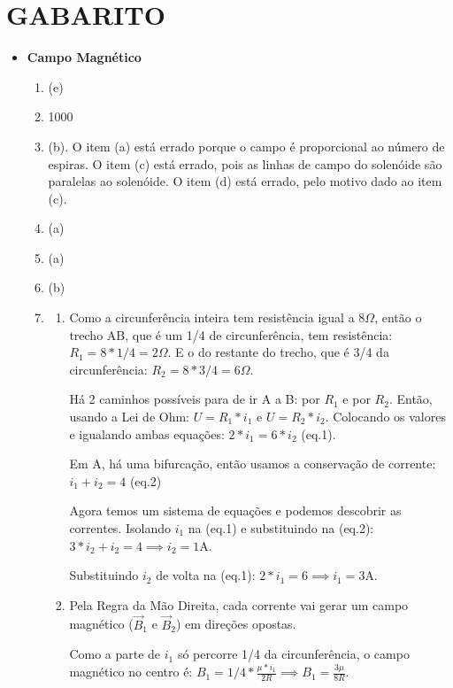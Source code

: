 \documentclass[12pt,letterpaper,fleqn]{article}
\begin{document}
    \pagebreak
    \section*{GABARITO}
    \begin{itemize}
        \item \textbf{Campo Magnético}
        \begin{enumerate}
            \item (e)
            \item 1000
            \item (b). O item (a) está errado porque o campo é proporcional ao número de espiras. O item (c) está errado, pois as linhas de campo do solenóide são paralelas ao solenóide. O item (d) está errado, pelo motivo dado ao item (c).
            \item (a)
            \item (a)
            \item (b) 
            \item 
            \begin{enumerate}
                \item Como a circunferência inteira tem resistência igual a $8 \Omega$, então o trecho AB, que é um 1/4 de circunferência, tem resistência: $R_1 = 8*1/4 = 2 \Omega$. E o do restante do trecho, que é 3/4 da circunferência: $R_2 = 8* 3/4 = 6 \Omega$.
                
                Há 2 caminhos possíveis para de ir A a B: por $R_1$ e por $R_2$. Então, usando a Lei de Ohm: $U = R_1*i_1$ e $U = R_2*i_2$. 
                Colocando os valores e igualando ambas equações: $2*i_1 = 6*i_2$ (eq.1).
                
                Em A, há uma bifurcação, então usamos a conservação de corrente: $i_1 + i_2 = 4$ (eq.2)
                
                Agora temos um sistema de equações e podemos descobrir as correntes. Isolando $i_1$ na (eq.1) e substituindo na (eq.2): $3*i_2 + i_2 = 4 \implies i_2 = 1$A.
                
                Substituindo $i_2$ de volta na (eq.1): $2*i_1 = 6 \implies i_1 =3$A.
                
                \item Pela Regra da Mão Direita, cada corrente vai gerar um campo magnético ($\vec{B}_1$ e $\vec{B}_2$) em direções opostas. 
                
                Como a parte de $i_1$ só percorre 1/4 da circunferência, o campo magnético no centro é: $B_1 = 1/4 * \frac{\mu*i_1}{2R} \implies B_1 = \frac{3\mu}{8R}$.
                

\end{enumerate}
\end{enumerate}
\end{itemize}
\end{document}
